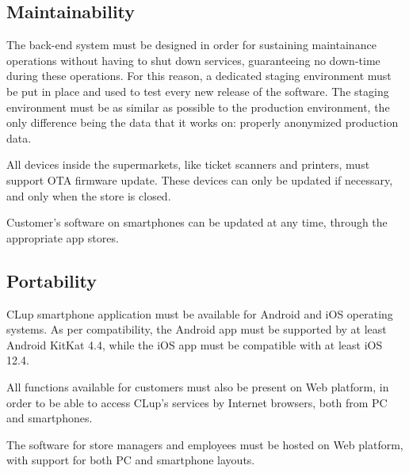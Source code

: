 \documentclass[../../main.tex]{subfiles}
\begin{document}
	\subsection{Maintainability}

	The back-end system must be designed in order for sustaining maintainance operations without having to 
	shut down services, guaranteeing no down-time during these operations. For this reason, a dedicated staging environment must be put in place and used to test every new release of the software. The staging environment must be as similar as possible to the production environment, the only difference being the data that it works on: properly anonymized production data.

	All devices inside the supermarkets, like ticket scanners and printers, must support OTA firmware update. These devices can only be updated if necessary, and only when the store is closed.

	Customer's software on smartphones can be updated at any time, through the appropriate app stores.

	\subsection{Portability}

	CLup smartphone application must be available for Android and iOS operating systems. As per compatibility, the Android app must be supported by at least Android KitKat 4.4, while the iOS app must be compatible with at least iOS 12.4.

	All functions available for customers must also be present on Web platform, in order to be able to access 
	CLup's services by Internet browsers, both from PC and smartphones.

	The software for store managers and employees must be hosted on Web platform, with support for both PC and smartphone layouts.

	
\end{document}
